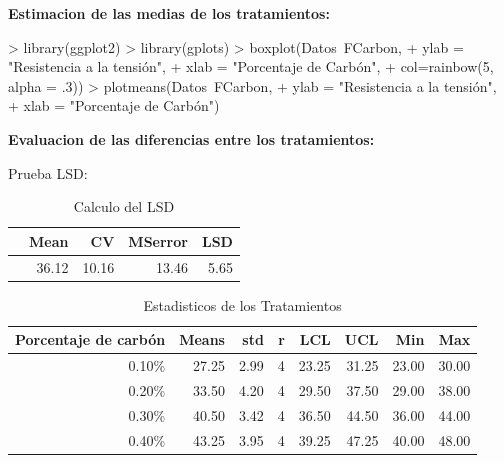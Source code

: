 \documentclass[12pt,letterpaper]{report}
\begin{document}
\textbf{Estimacion de las medias de los tratamientos:}
\begin{Schunk}
\begin{Sinput}
> library(ggplot2)
> library(gplots)
> boxplot(Datos~FCarbon,
+         ylab = "Resistencia a la tensión",
+         xlab = "Porcentaje de Carbón",
+         col=rainbow(5, alpha = .3))
> plotmeans(Datos~FCarbon,
+           ylab = "Resistencia a la tensión",
+           xlab = "Porcentaje de Carbón")
\end{Sinput}
\end{Schunk}

\textbf{Evaluacion de las diferencias entre los tratamientos:}

Prueba LSD:
\begin{Schunk}
\end{Schunk}

\begin{table}[ht]
\centering
\begin{tabular}{rrrrr}
  \hline
 & Mean & CV & MSerror & LSD \\ 
  \hline
  & 36.12 & 10.16 & 13.46 & 5.65 \\ 
   \hline
\end{tabular}
\caption{Calculo del LSD}
\end{table}

\begin{table}[ht]
\centering
\begin{tabular}{rrrrrrrr}
  \hline
Porcentaje de carbón  & Means & std & r & LCL & UCL & Min & Max \\ 
  \hline
0.10\% & 27.25 & 2.99 &   4 & 23.25 & 31.25 & 23.00 & 30.00 \\ 
  0.20\% & 33.50 & 4.20 &   4 & 29.50 & 37.50 & 29.00 & 38.00 \\ 
  0.30\% & 40.50 & 3.42 &   4 & 36.50 & 44.50 & 36.00 & 44.00 \\ 
  0.40\% & 43.25 & 3.95 &   4 & 39.25 & 47.25 & 40.00 & 48.00 \\ 
   \hline
\end{tabular}
\caption{Estadisticos de los Tratamientos}
\end{table}
\end{document}
